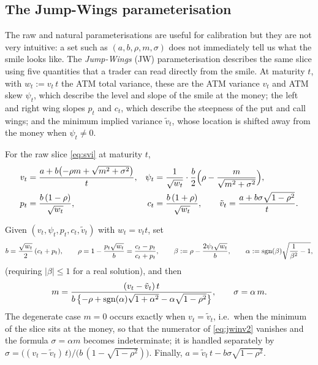 \subsection{The Jump-Wings parameterisation}

The raw and natural parameterisations are useful for calibration but they are not very intuitive: a set such as $(a,b,\rho,m,\sigma)$ does not immediately tell us what the smile looks like. The \emph{Jump-Wings} (JW) parameterisation \cite{gatheraljacquier2014} describes the same slice using five quantities that a trader can read directly from the smile. At maturity $t$, with $w_t:=v_t\,t$ the ATM total variance, these are the ATM variance $v_t$ and ATM skew $\psi_t$, which describe the level and slope of the smile at the money; the left and right wing slopes $p_t$ and $c_t$, which describe the steepness of the put and call wings; and the minimum implied variance $\tilde v_t$, whose location is shifted away from the money when $\psi_t\neq0$.



\begin{lemma}\label{lem:jw}
For the raw slice \eqref{eq:svi} at maturity $t$,
\begin{equation}\label{eq:jw}
\begin{aligned}
v_t&=\frac{a+b\bigl(-\rho m+\sqrt{m^2+\sigma^2}\bigr)}{t},
&\psi_t&=\frac{1}{\sqrt{w_t}}\cdot\frac{b}{2}\Bigl(\rho-\frac{m}{\sqrt{m^2+\sigma^2}}\Bigr),\\
p_t&=\frac{b\,(1-\rho)}{\sqrt{w_t}},
&c_t&=\frac{b\,(1+\rho)}{\sqrt{w_t}},\qquad
\tilde v_t=\frac{a+b\sigma\sqrt{1-\rho^2}}{t}.
\end{aligned}
\end{equation}
\end{lemma}


\begin{lemma}\label{lem:jwinv}
Given $(v_t,\psi_t,p_t,c_t,\tilde v_t)$ with $w_t=v_tt$, set
\begin{equation}\label{eq:jwinv}
b=\frac{\sqrt{w_t}}{2}\,(c_t+p_t),\qquad
\rho=1-\frac{p_t\sqrt{w_t}}{b}=\frac{c_t-p_t}{c_t+p_t},\qquad
\beta:=\rho-\frac{2\psi_t\sqrt{w_t}}{b},\qquad
\alpha:=\operatorname{sgn}(\beta)\sqrt{\frac1{\beta^2}-1},
\end{equation}
(requiring $|\beta|\le1$ for a real solution), and then
\begin{equation}\label{eq:jwinv2}
m=\frac{(v_t-\tilde v_t)\,t}
{b\,\bigl\{-\rho+\operatorname{sgn}(\alpha)\sqrt{1+\alpha^2}-\alpha\sqrt{1-\rho^2}\bigr\}},\qquad
\sigma=\alpha\,m.
\end{equation}
The degenerate case $m=0$ occurs exactly when $v_t=\tilde v_t$, i.e.\ when the minimum of the
slice sits at the money, so that the numerator of \eqref{eq:jwinv2} vanishes and the formula
$\sigma=\alpha m$ becomes indeterminate; it is handled separately by
$\sigma=\bigl((v_t-\tilde v_t)\,t\bigr)/\bigl(b\,(1-\sqrt{1-\rho^2})\bigr)$. Finally,
$a=\tilde v_t\,t-b\sigma\sqrt{1-\rho^2}$.
\end{lemma}


